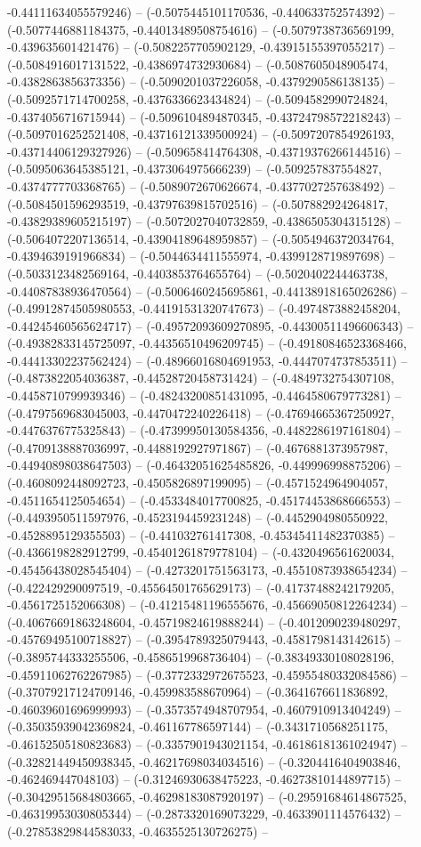 -0.44111634055579246) -- (-0.5075445101170536, -0.440633752574392) -- (-0.5077446881184375, -0.44013489508754616) -- (-0.5079738736569199, -0.439635601421476) -- (-0.5082257705902129, -0.43915155397055217) -- (-0.5084916017131522, -0.4386974732930684) -- (-0.5087605048905474, -0.4382863856373356) -- (-0.5090201037226058, -0.4379290586138135) -- (-0.5092571714700258, -0.4376336623434824) -- (-0.5094582990724824, -0.4374056716715944) -- (-0.5096104894870345, -0.43724798572218243) -- (-0.5097016252521408, -0.43716121339500924) -- (-0.5097207854926193, -0.43714406129327926) -- (-0.509658414764308, -0.43719376266144516) -- (-0.5095063645385121, -0.4373064975666239) -- (-0.509257837554827, -0.4374777703368765) -- (-0.5089072670626674, -0.4377027257638492) -- (-0.5084501596293519, -0.43797639815702516) -- (-0.507882924264817, -0.43829389605215197) -- (-0.5072027040732859, -0.4386505304315128) -- (-0.5064072207136514, -0.43904189648959857) -- (-0.5054946372034764, -0.4394639191966834) -- (-0.5044634411555974, -0.4399128719897698) -- (-0.5033123482569164, -0.4403853764655764) -- (-0.5020402244463738, -0.44087838936470564) -- (-0.5006460245695861, -0.44138918165026286) -- (-0.49912874505980553, -0.44191531320747673) -- (-0.4974873882458204, -0.44245460565624717) -- (-0.49572093609270895, -0.44300511496606343) -- (-0.49382833145725097, -0.44356510496209745) -- (-0.49180846523368466, -0.44413302237562424) -- (-0.48966016804691953, -0.4447074737853511) -- (-0.4873822054036387, -0.44528720458731424) -- (-0.4849732754307108, -0.4458710799939346) -- (-0.48243200851431095, -0.4464580679773281) -- (-0.4797569683045003, -0.4470472240226418) -- (-0.47694665367250927, -0.4476376775325843) -- (-0.47399950130584356, -0.4482286197161804) -- (-0.4709138887036997, -0.4488192927971867) -- (-0.4676881373957987, -0.44940898038647503) -- (-0.46432051625485826, -0.449996998875206) -- (-0.4608092448092723, -0.4505826897199095) -- (-0.4571524964904057, -0.4511654125054654) -- (-0.4533484017700825, -0.45174453868666553) -- (-0.4493950511597976, -0.4523194459231248) -- (-0.4452904980550922, -0.4528895129355503) -- (-0.441032761417308, -0.45345411482370385) -- (-0.4366198282912799, -0.45401261879778104) -- (-0.4320496561620034, -0.45456438028545404) -- (-0.4273201751563173, -0.45510873938654234) -- (-0.422429290097519, -0.45564501765629173) -- (-0.41737488242179205, -0.4561725152066308) -- (-0.41215481196555676, -0.45669050812264234) -- (-0.40676691863248604, -0.45719824619888244) -- (-0.4012090239480297, -0.45769495100718827) -- (-0.3954789325079443, -0.4581798143142615) -- (-0.3895744333255506, -0.4586519968736404) -- (-0.38349330108028196, -0.45911062762267985) -- (-0.3772332972675523, -0.45955480332084586) -- (-0.37079217124709146, -0.459983588670964) -- (-0.3641676611836892, -0.46039601696999993) -- (-0.3573574948707954, -0.4607910913404249) -- (-0.35035939042369824, -0.461167786597144) -- (-0.3431710568251175, -0.46152505180823683) -- (-0.3357901943021154, -0.46186181361024947) -- (-0.32821449450938345, -0.46217698034034516) -- (-0.3204416404903846, -0.462469447048103) -- (-0.31246930638475223, -0.46273810144897715) -- (-0.30429515684803665, -0.46298183087920197) -- (-0.29591684614867525, -0.46319953030805344) -- (-0.2873320169073229, -0.4633901114576432) -- (-0.27853829844583033, -0.4635525130726275) -- 